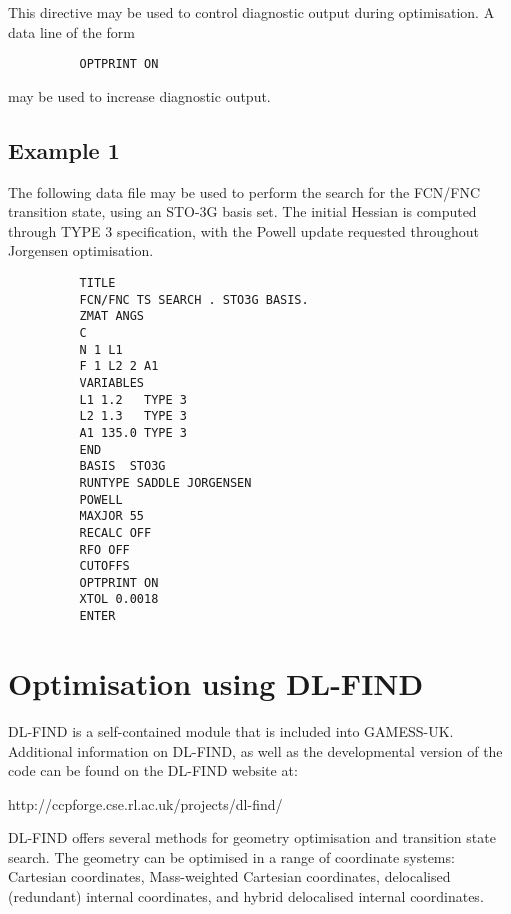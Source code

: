 \documentclass[11pt,fleqn]{article}
\begin{document}
This directive may be used to control
diagnostic output during optimisation.
A data line of the form

{
\footnotesize
\begin{verbatim}
          OPTPRINT ON
\end{verbatim}
}
may be used to increase diagnostic output.

\subsection{Example 1}

The following data file may be used to perform the 
search for the FCN/FNC transition state, using an STO-3G basis set.
The initial Hessian is computed through TYPE 3 specification,
with the Powell update requested throughout Jorgensen optimisation.

{
\footnotesize
\begin{verbatim}
          TITLE                
          FCN/FNC TS SEARCH . STO3G BASIS.
          ZMAT ANGS                         
          C                    
          N 1 L1               
          F 1 L2 2 A1
          VARIABLES            
          L1 1.2   TYPE 3
          L2 1.3   TYPE 3
          A1 135.0 TYPE 3
          END                     
          BASIS  STO3G
          RUNTYPE SADDLE JORGENSEN 
          POWELL
          MAXJOR 55
          RECALC OFF
          RFO OFF
          CUTOFFS
          OPTPRINT ON
          XTOL 0.0018
          ENTER
\end{verbatim}
}

\section{Optimisation using DL-FIND}

DL-FIND is a self-contained module that is included into
GAMESS-UK. Additional information on DL-FIND, as well as the
developmental version of the code can be found on the DL-FIND website
at:

http://ccpforge.cse.rl.ac.uk/projects/dl-find/

DL-FIND offers several methods for geometry optimisation and transition state
search. The geometry can be optimised in a range of coordinate systems:
Cartesian coordinates, Mass-weighted Cartesian coordinates, delocalised
(redundant) internal coordinates, and hybrid delocalised internal
coordinates.
\end{document}
